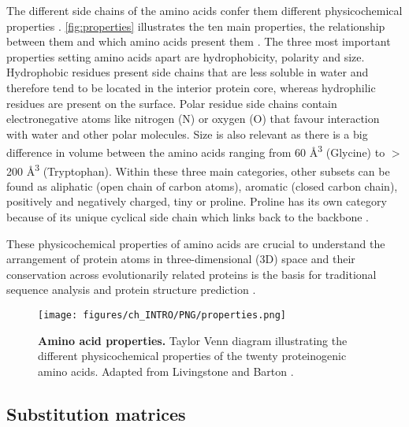 The different side chains of the amino acids confer them different physicochemical properties \cite{SNEATH_1966_PROPERTIES}. \autoref{fig:properties} illustrates the ten main properties, the relationship between them and which amino acids present them \cite{TAYLOR_1986_PROPERTIES}. The three most important properties setting amino acids apart are hydrophobicity, polarity and size. Hydrophobic residues present side chains that are less soluble in water and therefore tend to be located in the interior protein core, whereas hydrophilic residues are present on the surface. Polar residue side chains contain electronegative atoms like nitrogen (N) or oxygen (O) that favour interaction with water and other polar molecules. Size is also relevant as there is a big difference in volume between the amino acids ranging from 60 \AA{}\textsuperscript{3} (Glycine) to $>$200 \AA{}\textsuperscript{3} (Tryptophan). Within these three main categories, other subsets can be found as aliphatic (open chain of carbon atoms), aromatic (closed carbon chain), positively and negatively charged, tiny or proline. Proline has its own category because of its unique cyclical side chain which links back to the backbone \cite{ZVELEBIL_1987_SSPRED}.

These physicochemical properties of amino acids are crucial to understand the arrangement of protein atoms in three-dimensional (3D) space and their conservation across evolutionarily related proteins is the basis for traditional sequence analysis and protein structure prediction \cite{CHOTHIA_1986_DIVERGENCE}.

\begin{figure}[htb!]
    \centering
    \texttt{[image: figures/ch\_INTRO/PNG/properties.png]}
    \caption[Amino acid properties]{\textbf{Amino acid properties.} Taylor Venn diagram illustrating the different physicochemical properties of the twenty proteinogenic amino acids. Adapted from Livingstone and Barton \cite{LIVINGSTONE_1993_MSA}.}
    \label{fig:properties}
\end{figure}

\subsection{Substitution matrices}

